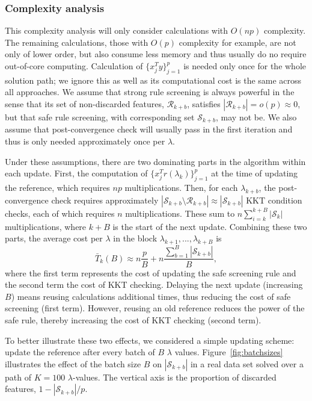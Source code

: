\subsubsection{Complexity analysis}

This complexity analysis will only consider calculations with $O(np)$ complexity. The remaining calculations, those with $O(p)$ complexity for example, are not only of lower order, but also consume less memory and thus usually do no require out-of-core computing. Calculation of $\{x_j^Ty\}_{j=1}^p$ is needed only once for the whole solution path; we ignore this as well as its computational cost is the same across all approaches. We assume that strong rule screening is always powerful in the sense that its set of non-discarded features, $\mathcal{R}_{k+b}$, satisfies $|\mathcal{R}_{k+b}|=o(p) \approx 0$, but that safe rule screening, with corresponding set $\mathcal{S}_{k+b}$, may not be. We also assume that post-convergence check will usually pass in the first iteration and thus is only needed approximately once per $\lambda$.

Under these assumptions, there are two dominating parts in the algorithm within each update. First, the computation of $\{x_j^Tr(\lambda_k)\}_{j=1}^p$ at the time of updating the reference, which requires $np$ multiplications. Then, for each $\lambda_{k+b}$, the post-convergence check requires approximately $|\mathcal{S}_{k+b} \setminus \mathcal{R}_{k+b}| \approx |\mathcal{S}_{k+b}|$ KKT condition checks, each of which requires $n$ multiplications. These sum to $n\sum_{i=k}^{k+B}|\mathcal{S}_k|$ multiplications, where $k+B$ is the start of the next update. Combining these two parts, the average cost per $\lambda$ in the block $\lambda_{k+1},...,\lambda_{k+B}$ is
\begin{equation}
    \label{eq:cost}
    \bar{T}_k(B) \approx n\frac{p}{B}+n\frac{\sum_{b=1}^B|\mathcal{S}_{k+b}|}{B},
\end{equation}
where the first term represents the cost of updating the safe screening rule and the second term the cost of KKT checking. Delaying the next update (increasing $B$) means reusing calculations additional times, thus reducing the cost of safe screening (first term). However, reusing an old reference reduces the power of the safe rule, thereby increasing the cost of KKT checking (second term).

To better illustrate these two effects, we considered a simple updating scheme: update the reference after every batch of $B$ $\lambda$ values. Figure~\ref{fig:batchsizes} illustrates the effect of the batch size $B$ on $|\mathcal{S}_{k+b}|$ in a real data set solved over a path of $K=100$ $\lambda$-values. The vertical axis is the proportion of discarded features, $1-|\mathcal{S}_{k+b}|/p$.

